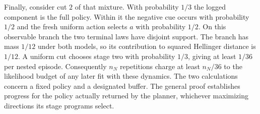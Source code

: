 Finally, consider cut $2$ of that mixture. With probability $1/3$ the logged component is the full policy. Within it the negative cue occurs with probability $1/2$ and the fresh uniform action selects $a$ with probability $1/2$. On this observable branch the two terminal laws have disjoint support. The branch has mass $1/12$ under both models, so its contribution to squared Hellinger distance is $1/12$. A uniform cut chooses stage two with probability $1/3$, giving at least $1/36$ per nested episode. Consequently $n_N$ repetitions charge at least $n_N/36$ to the likelihood budget of any later fit with these dynamics. The two calculations concern a fixed policy and a designated buffer. The general proof establishes progress for the policy actually returned by the planner, whichever maximizing directions its stage programs select.
